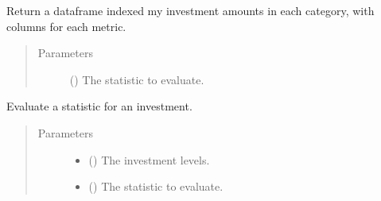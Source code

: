 \documentclass[letterpaper,10pt,english]{sphinxmanual}
\begin{document}
\begin{fulllineitems}
\begin{fulllineitems}
\label{\detokenize{tyche:tyche.Evaluator.Evaluator.evaluate_corners_wide}}
Return a dataframe indexed my investment amounts in each category,
with columns for each metric.
\begin{quote}\begin{description}
\item[{Parameters}] \leavevmode
{} () \textendash{} The statistic to evaluate.

\end{description}\end{quote}

\end{fulllineitems}


\begin{fulllineitems}
\label{\detokenize{tyche:tyche.Evaluator.Evaluator.evaluate_statistic}}
Evaluate a statistic for an investment.
\begin{quote}\begin{description}
\item[{Parameters}] \leavevmode\begin{itemize}
\item {} 
 () \textendash{} The investment levels.

\item {} 
 () \textendash{} The statistic to evaluate.

\end{itemize}

\end{description}\end{quote}

\end{fulllineitems}



\end{fulllineitems}
\end{document}
